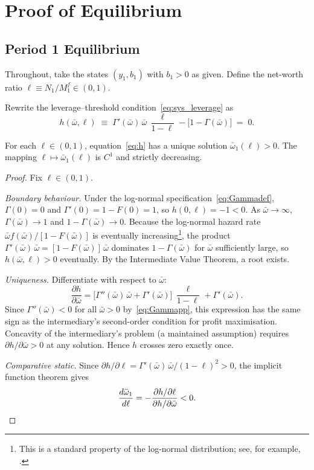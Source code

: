\section{Proof of Equilibrium}

\subsection{Period 1 Equilibrium}

Throughout, take the states $(y_1, b_1)$ with $b_1 > 0$ as given. Define the net-worth ratio $\ell \equiv N_1 / M_1^f \in (0,1)$.

Rewrite the leverage--threshold condition~\eqref{eq:sys_leverage} as
\begin{equation}\label{eq:h}
    h(\bar\omega, \ell) \;\equiv\; \Gamma'(\bar\omega)\,\bar\omega\,\frac{\ell}{1 - \ell} - \bigl[1 - \Gamma(\bar\omega)\bigr] \;=\; 0.
\end{equation}

\begin{lemma}\label{lem:omega-ell}
For each $\ell \in (0,1)$, equation~\eqref{eq:h} has a unique solution $\bar\omega_1(\ell) > 0$.  The mapping $\ell \mapsto \bar\omega_1(\ell)$ is $C^1$ and strictly decreasing.
\end{lemma}

\begin{proof}
Fix $\ell \in (0,1)$.

\emph{Boundary behaviour.}  Under the log-normal specification~\eqref{eq:Gammadef}, $\Gamma(0) = 0$ and $\Gamma'(0) = 1 - F(0) = 1$, so $h(0, \ell) = -1 < 0$.  As $\bar\omega \to \infty$, $\Gamma(\bar\omega) \to 1$ and $1 - \Gamma(\bar\omega) \to 0$.  Because the log-normal hazard rate $\bar\omega f(\bar\omega)/[1 - F(\bar\omega)]$ is eventually increasing\footnote{This is a standard property of the log-normal distribution; see, for example, \citet[Appendix~B]{bernanke_chapter_1999}.}, the product $\Gamma'(\bar\omega)\,\bar\omega = [1 - F(\bar\omega)]\,\bar\omega$ dominates $1 - \Gamma(\bar\omega)$ for $\bar\omega$ sufficiently large, so $h(\bar\omega, \ell) > 0$ eventually.  By the Intermediate Value Theorem, a root exists.

\emph{Uniqueness.}  Differentiate with respect to $\bar\omega$:
\[
    \frac{\partial h}{\partial \bar\omega} = \bigl[\Gamma''(\bar\omega)\,\bar\omega + \Gamma'(\bar\omega)\bigr]\,\frac{\ell}{1 - \ell} + \Gamma'(\bar\omega).
\]
Since $\Gamma''(\bar\omega) < 0$ for all $\bar\omega > 0$ by~\eqref{eq:Gammapp}, this expression has the same sign as the intermediary's second-order condition for profit maximisation.  Concavity of the intermediary's problem (a maintained assumption) requires $\partial h / \partial \bar\omega > 0$ at any solution.  Hence $h$ crosses zero exactly once.

\emph{Comparative static.}  Since $\partial h / \partial \ell = \Gamma'(\bar\omega)\,\bar\omega / (1 - \ell)^2 > 0$, the implicit function theorem gives
\[
    \frac{d\bar\omega_1}{d\ell} = -\frac{\partial h / \partial \ell}{\partial h / \partial \bar\omega} < 0. \qedhere
\]
\end{proof}

